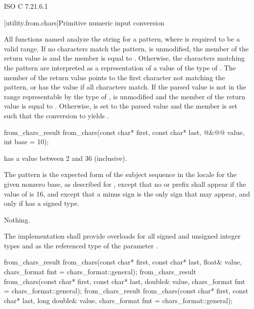 \xref ISO C 7.21.6.1

[utility.from.chars]{Primitive numeric input conversion}

\pnum
All functions named 
analyze the string 
for a pattern,
where  is required to be a valid range.
If no characters match the pattern,
 is unmodified,
the member  of the return value is  and
the member  is equal to .
Otherwise,
the characters matching the pattern
are interpreted as a representation
of a value of the type of .
The member 
of the return value
points to the first character
not matching the pattern,
or has the value 
if all characters match.
If the parsed value
is not in the range
representable by the type of ,
 is unmodified and
the member  of the return value
is equal to .
Otherwise,
 is set to the parsed value and
the member  is set
such that the conversion to  yields .

%
\begin{itemdecl}
from_chars_result from_chars(const char* first, const char* last,
                             @\seebelow@&@\itcorr[-1]@ value, int base = 10);
\end{itemdecl}

\begin{itemdescr}
\pnum
\requires {} has a value between 2 and 36 (inclusive).

\pnum
\effects The pattern is the expected form of the subject sequence
in the  locale
for the given nonzero base,
as described for ,
except that no  or  prefix shall appear
if the value of  is 16,
and except that a minus sign
is the only sign that may appear,
and only if  has a signed type.

\pnum
\throws Nothing.

\pnum
\remarks
The implementation shall provide overloads
for all signed and unsigned integer types
and 
as the referenced type of the parameter .
\end{itemdescr}

%
\begin{itemdecl}
from_chars_result from_chars(const char* first, const char* last, float& value,
                             chars_format fmt = chars_format::general);
from_chars_result from_chars(const char* first, const char* last, double& value,
                             chars_format fmt = chars_format::general);
from_chars_result from_chars(const char* first, const char* last, long double& value,
                             chars_format fmt = chars_format::general);
\end{itemdecl}

